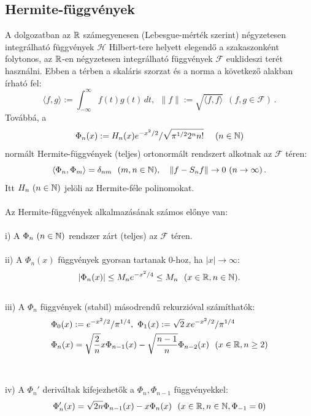 \documentclass[oneside,titlepage,12pt,a4paper]{report}
\begin{document}
\subsection{Hermite-függvények}
A dolgozatban  az $\Bbb R$ számegyenesen (Lebesgue-mérték szerint) négyzetesen integrálható függvények $\mathcal H$ Hilbert-tere helyett elegendő a szakaszonként folytonos, az $\Bbb R$-en  négyzetesen integrálható függvények $\mathcal F$ euklideszi terét használni. Ebben a térben a skaláris szorzat és a norma a következő alakban írható fel:
\begin{equation}
 \langle f,g\rangle:=\int_{-\infty}^\infty f(t)g(t)\, dt,\ \ \|f\|:=\sqrt{\langle f,f\rangle}\ \ (f,g\in\mathcal F)\,.
\label{eq:dotprod}
\end{equation}
Továbbá, a
 \begin{equation*}
 \Phi_n(x):=H_n(x)e^{-x^2/2}/\sqrt{\pi^{1/2}2^n n!}\quad \ (n\in\Bbb N)
 \end{equation*}
normált Hermite-függvények (teljes) ortonormált rendszert alkotnak az $\mathcal F$ téren:
  \begin{equation*}
   \langle \Phi_n,\Phi_m\rangle=\delta_{nm}\ \ (m,n\in\Bbb N),\quad
  \|f-S_nf\|\to 0\ (n\to\infty)\,.
   \end{equation*}
Itt $H_n\ (n\in\Bbb N)$ jelöli az Hermite-féle polinomokat.
\\
\\
Az Hermite-függvények alkalmazásának számos előnye van: \\
\\
i) A $\Phi_n\ (n\in\Bbb N)$ rendszer zárt (teljes) az $\mathcal F$ téren. \\
\\
ii) A $\Phi_n(x)$ függvények gyorsan tartanak $0$-hoz, ha $|x|\to \infty$: \\
$$
|\Phi_n(x)|\le M_n e^{-x^2/4}\le M_n\ \ (x\in\Bbb R, n\in\Bbb N).
$$
\\
iii) A $\Phi_n$ függvények (stabil) másodrendű rekurzióval számíthatók: \\
\begin{equation}
\begin{split}
&\Phi_0(x):=e^{-x^2/2}/\pi^{1/4},\ \Phi_1(x):=\sqrt{2}\, x e^{-x^2/2}/\pi^{1/4}\\
&\Phi_n(x)=\sqrt{\frac 2 n} x \Phi_{n-1}(x)-\sqrt{\frac{n-1}n}\Phi_{n-2}(x)\ \ (x\in\Bbb R, n\ge 2)
\end{split}
\end{equation} 
\\
\\
iv) A $\Phi_n'$ deriváltak kifejezhetők a $\Phi_n, \Phi_{n-1} $ függvényekkel: \\
\begin{equation}
\Phi_n'(x)=\sqrt{2n}\Phi_{n-1}(x)-x\Phi_n(x)\ \ (x\in\Bbb R, n\in\Bbb N,\Phi_{-1}=0)
\end{equation}
\end{document}
